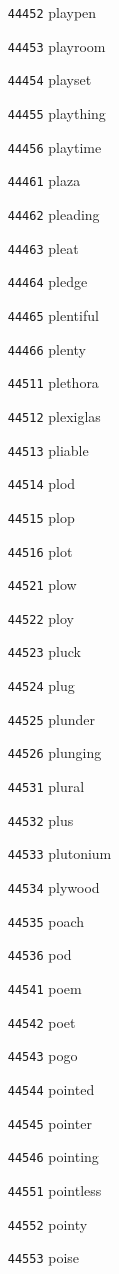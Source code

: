 \documentclass[twoside,11pt]{article}
\begin{document}
\begin{multicols}{5}
\begin{enumerate}
\item[\texttt{44452}] playpen
\item[\texttt{44453}] playroom
\item[\texttt{44454}] playset
\item[\texttt{44455}] plaything
\item[\texttt{44456}] playtime
\item[\texttt{44461}] plaza
\item[\texttt{44462}] pleading
\item[\texttt{44463}] pleat
\item[\texttt{44464}] pledge
\item[\texttt{44465}] plentiful
\item[\texttt{44466}] plenty
\item[\texttt{44511}] plethora
\item[\texttt{44512}] plexiglas
\item[\texttt{44513}] pliable
\item[\texttt{44514}] plod
\item[\texttt{44515}] plop
\item[\texttt{44516}] plot
\item[\texttt{44521}] plow
\item[\texttt{44522}] ploy
\item[\texttt{44523}] pluck
\item[\texttt{44524}] plug
\item[\texttt{44525}] plunder
\item[\texttt{44526}] plunging
\item[\texttt{44531}] plural
\item[\texttt{44532}] plus
\item[\texttt{44533}] plutonium
\item[\texttt{44534}] plywood
\item[\texttt{44535}] poach
\item[\texttt{44536}] pod
\item[\texttt{44541}] poem
\item[\texttt{44542}] poet
\item[\texttt{44543}] pogo
\item[\texttt{44544}] pointed
\item[\texttt{44545}] pointer
\item[\texttt{44546}] pointing
\item[\texttt{44551}] pointless
\item[\texttt{44552}] pointy
\item[\texttt{44553}] poise

\end{enumerate}
\end{multicols}
\end{document}
